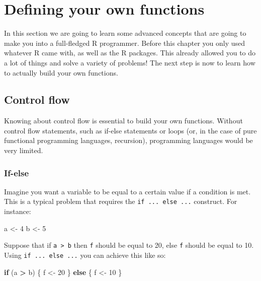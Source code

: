 \documentclass[]{gitbook}
\newenvironment{Shaded}{\begin{snugshade}}{\end{snugshade}}
\newcommand{\ControlFlowTok}[1]{\textcolor[rgb]{0.13,0.29,0.53}{\textbf{#1}}}
\newcommand{\DecValTok}[1]{\textcolor[rgb]{0.00,0.00,0.81}{#1}}
\newcommand{\NormalTok}[1]{#1}
\newcommand{\OperatorTok}[1]{\textcolor[rgb]{0.81,0.36,0.00}{\textbf{#1}}}
\newcommand{\StringTok}[1]{\textcolor[rgb]{0.31,0.60,0.02}{#1}}
\begin{document}
\hypertarget{defining-your-own-functions}{%
\section{Defining your own functions}\label{defining-your-own-functions}}

In this section we are going to learn some advanced concepts that are going to make you into a
full-fledged R programmer. Before this chapter you only used whatever R came with, as well as the
R packages. This already allowed you to do a lot of things and solve a variety of problems!
The next step is now to learn how to actually build your own functions.

\hypertarget{control-flow}{%
\subsection{Control flow}\label{control-flow}}

Knowing about control flow is essential to build your own functions. Without control flow statements,
such as if-else statements or loops (or, in the case of pure functional programming languages, recursion),
programming languages would be very limited.

\hypertarget{if-else}{%
\subsubsection{If-else}\label{if-else}}

Imagine you want a variable to be equal to a certain value if a condition is met. This is a typical
problem that requires the \texttt{if\ ...\ else\ ...} construct. For instance:

\begin{Shaded}
\begin{Highlighting}[]
\NormalTok{a <-}\StringTok{ }\DecValTok{4}
\NormalTok{b <-}\StringTok{ }\DecValTok{5}
\end{Highlighting}
\end{Shaded}

Suppose that if \texttt{a\ \textgreater{}\ b} then \texttt{f} should be equal to 20, else \texttt{f} should be equal to 10. Using \texttt{if\ ...\ else\ ...} you can achieve this like so:

\begin{Shaded}
\begin{Highlighting}[]
\ControlFlowTok{if}\NormalTok{ (a }\OperatorTok{>}\StringTok{ }\NormalTok{b) \{}
\NormalTok{  f <-}\StringTok{ }\DecValTok{20}
\NormalTok{    \} }\ControlFlowTok{else}\NormalTok{ \{}
\NormalTok{  f <-}\StringTok{ }\DecValTok{10}
\NormalTok{\}}
\end{Highlighting}
\end{Shaded}
\end{document}
